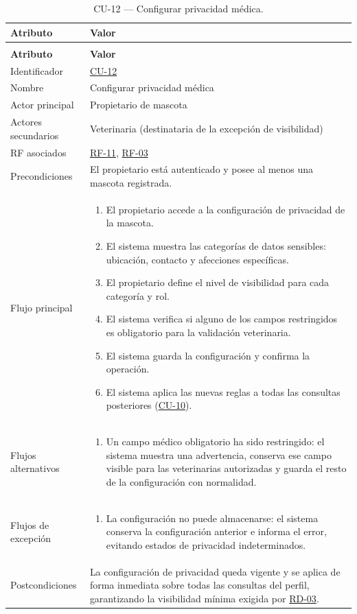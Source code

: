 \documentclass[journal,onecolumn]{IEEEtran}
\makeatletter
\newenvironment{atributos}[2]{%
	\small
	\begin{longtable}{@{}>{\raggedright\arraybackslash}p{4.2cm} >{\raggedright\arraybackslash}p{11.2cm}@{}}
		\caption{#2}\label{tab:#1}\\
		\toprule
		\textbf{Atributo} & \textbf{Valor} \\
		\midrule
		\endfirsthead
		\multicolumn{2}{@{}l}{\small\itshape (continuación)}\\
		\toprule
		\textbf{Atributo} & \textbf{Valor} \\
		\midrule
		\endhead
		\bottomrule
		\endlastfoot
	}{%
	\end{longtable}
	\normalsize
}
\makeatother
\begin{document}
	\begin{atributos}{CU-12}{CU-12 --- Configurar privacidad médica.}
		Identificador & \hyperref[tab:CU-12]{CU-12} \\
		Nombre & Configurar privacidad médica \\
		Actor principal & Propietario de mascota \\
		Actores secundarios & Veterinaria (destinataria de la excepción de visibilidad) \\
		RF asociados & \hyperref[tab:RF-11]{RF-11}, \hyperref[tab:RF-03]{RF-03} \\
		Precondiciones & El propietario está autenticado y posee al menos una mascota registrada. \\
		Flujo principal &
		\begin{enumerate}[leftmargin=*, nosep]
			\item El propietario accede a la configuración de privacidad de la mascota.
			\item El sistema muestra las categorías de datos sensibles: ubicación, contacto y afecciones específicas.
			\item El propietario define el nivel de visibilidad para cada categoría y rol.
			\item El sistema verifica si alguno de los campos restringidos es obligatorio para la validación veterinaria.
			\item El sistema guarda la configuración y confirma la operación.
			\item El sistema aplica las nuevas reglas a todas las consultas posteriores (\hyperref[tab:CU-10]{CU-10}).
		\end{enumerate} \\
		Flujos alternativos &
		\begin{enumerate}[leftmargin=*, nosep]
			\item[4.1] Un campo médico obligatorio ha sido restringido: el sistema muestra una advertencia, conserva ese campo visible para las veterinarias autorizadas y guarda el resto de la configuración con normalidad.
		\end{enumerate} \\
		Flujos de excepción &
		\begin{enumerate}[leftmargin=*, nosep]
			\item[5.1] La configuración no puede almacenarse: el sistema conserva la configuración anterior e informa el error, evitando estados de privacidad indeterminados.
		\end{enumerate} \\
		Postcondiciones & La configuración de privacidad queda vigente y se aplica de forma inmediata sobre todas las consultas del perfil, garantizando la visibilidad mínima exigida por \hyperref[tab:RD-03]{RD-03}. \\
	\end{atributos}
	
\end{document}
